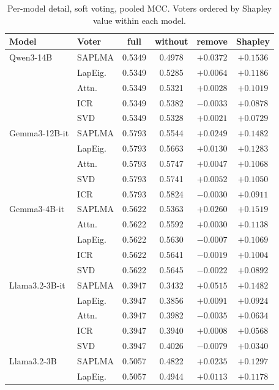 \begin{table}[h]
  \centering
  \caption{Per-model detail, soft voting, pooled MCC. Voters ordered by Shapley
  value within each model.}
  \footnotesize
  \begin{tabular}{l l c c c c}
    \hline
    Model & Voter & full & without & remove & Shapley \\
    \hline
    Qwen3-14B & SAPLMA & 0.5349 & 0.4978 & $+0.0372$ & $+0.1536$ \\
     & LapEig. & 0.5349 & 0.5285 & $+0.0064$ & $+0.1186$ \\
     & Attn. & 0.5349 & 0.5321 & $+0.0028$ & $+0.1019$ \\
     & ICR & 0.5349 & 0.5382 & $-0.0033$ & $+0.0878$ \\
     & SVD & 0.5349 & 0.5328 & $+0.0021$ & $+0.0729$ \\
    \hline
    Gemma3-12B-it & SAPLMA & 0.5793 & 0.5544 & $+0.0249$ & $+0.1482$ \\
     & LapEig. & 0.5793 & 0.5663 & $+0.0130$ & $+0.1283$ \\
     & Attn. & 0.5793 & 0.5747 & $+0.0047$ & $+0.1068$ \\
     & SVD & 0.5793 & 0.5741 & $+0.0052$ & $+0.1050$ \\
     & ICR & 0.5793 & 0.5824 & $-0.0030$ & $+0.0911$ \\
    \hline
    Gemma3-4B-it & SAPLMA & 0.5622 & 0.5363 & $+0.0260$ & $+0.1519$ \\
     & Attn. & 0.5622 & 0.5592 & $+0.0030$ & $+0.1138$ \\
     & LapEig. & 0.5622 & 0.5630 & $-0.0007$ & $+0.1069$ \\
     & ICR & 0.5622 & 0.5641 & $-0.0019$ & $+0.1004$ \\
     & SVD & 0.5622 & 0.5645 & $-0.0022$ & $+0.0892$ \\
    \hline
    Llama3.2-3B-it & SAPLMA & 0.3947 & 0.3432 & $+0.0515$ & $+0.1482$ \\
     & LapEig. & 0.3947 & 0.3856 & $+0.0091$ & $+0.0924$ \\
     & Attn. & 0.3947 & 0.3982 & $-0.0035$ & $+0.0634$ \\
     & ICR & 0.3947 & 0.3940 & $+0.0008$ & $+0.0568$ \\
     & SVD & 0.3947 & 0.4026 & $-0.0079$ & $+0.0340$ \\
    \hline
    Llama3.2-3B & SAPLMA & 0.5057 & 0.4822 & $+0.0235$ & $+0.1297$ \\
     & LapEig. & 0.5057 & 0.4944 & $+0.0113$ & $+0.1178$ \\

\end{tabular}
\end{table}
